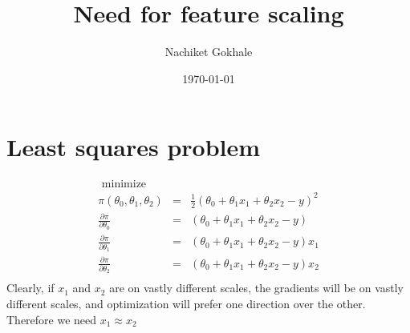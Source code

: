 \documentclass{article}
\newcommand{\ber}{\begin{eqnarray}}
\newcommand{\eer}{\end{eqnarray}}
\newcommand{\nn}{\nonumber}
\begin{document}
\title{Need for feature scaling}
\author{Nachiket Gokhale}
\date{\today}
\maketitle
\section{Least squares problem}
\ber
\text{ minimize }\nn\\
\pi(\theta_0,\theta_1,\theta_2) &=& \frac{1}{2}(\theta_0 + \theta_1x_1 + \theta_2x_2 - y)^2\\
\frac{\partial\pi}{\partial\theta_0} &=& (\theta_0 + \theta_1x_1 + \theta_2x_2 - y) \nn \\
\frac{\partial\pi}{\partial\theta_1} &=& (\theta_0 + \theta_1x_1 + \theta_2x_2 - y)x_1 \nn \\
\frac{\partial\pi}{\partial\theta_2} &=& (\theta_0 + \theta_1x_1 + \theta_2x_2 - y)x_2 \nn \\
\eer
Clearly, if $x_1$ and $x_2$ are on vastly different scales, the gradients will be on vastly different scales, and optimization will prefer one direction over the other. Therefore we need $x_1\approx x_2$ 
\end{document}
